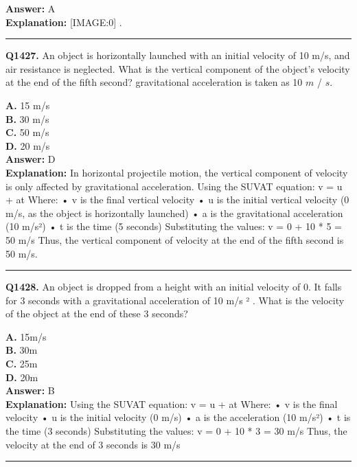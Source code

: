 \documentclass[12pt]{article}
\begin{document}
\textbf{Answer:} A \\
\textbf{Explanation:} [IMAGE:0]
.

\hrule
\vspace{1em}


\noindent
\textbf{Q1427.} An object is horizontally launched with an initial velocity of 10 m/s, and air resistance is neglected. What is the vertical component of the object's velocity at the end of the fifth second? gravitational acceleration is taken as 10
$𝑚$
/
$𝑠$.



\textbf{A.} 15 m/s \\
\textbf{B.} 30
m/s \\
\textbf{C.} 50 m/s \\
\textbf{D.} 20 m/s \\

\textbf{Answer:} D \\
\textbf{Explanation:} In horizontal projectile motion, the vertical component of velocity is only affected by gravitational acceleration. Using the SUVAT equation: v = u + at Where:
• v is the final vertical velocity
• u is the initial vertical velocity (0 m/s, as the object is horizontally launched)
• a is the gravitational acceleration (10 m/s²)
• t is the time (5 seconds) Substituting the values: v = 0 + 10 * 5 = 50 m/s Thus, the vertical component of velocity at the end of the fifth second is 50 m/s.

\hrule
\vspace{1em}


\noindent
\textbf{Q1428.} An object is dropped from a height with an initial velocity of 0. It falls for 3 seconds with a gravitational acceleration of 10 m/s
²
. What is the velocity of the object at the end of these 3 seconds?



\textbf{A.} 15m/s \\
\textbf{B.} 30m \\
\textbf{C.} 25m \\
\textbf{D.} 20m \\

\textbf{Answer:} B \\
\textbf{Explanation:} Using the SUVAT equation: v = u + at Where:
• v is the final velocity
• u is the initial velocity (0 m/s)
• a is the acceleration (10 m/s²)
• t is the time (3 seconds) Substituting the values: v = 0 + 10 * 3 = 30 m/s Thus, the velocity at the end of 3 seconds is 30 m/s

\hrule
\vspace{1em}
\end{document}
